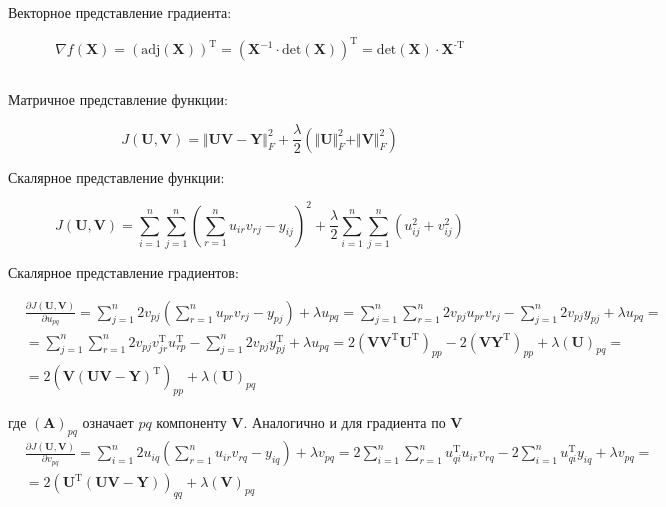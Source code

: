 	Векторное представление градиента:
	
	\begin{equation}
	\nabla f(\mathbf{X})  = (\text{adj}(\mathbf{X}))^{\text{T}} =
	(\mathbf{X}^{-1}\cdot \text{det}(\mathbf{X}))^{\text{T}} =
	\text{det}(\mathbf{X}) \cdot\mathbf{X}^{\text{-T}}
	\end{equation}
	
	\subsection{}
	
	Матричное представление функции:
	
	\begin{equation}
	J(\mathbf{U}, \mathbf{V}) = \Vert \mathbf{U} \mathbf{V} - \mathbf{Y} \Vert_F^2
	+ \frac{\lambda}{2}(\Vert \mathbf{U} \Vert_F^2 + \Vert \mathbf{V}\Vert_F^2)
	\end{equation}
	
	Скалярное представление функции:
	
	\begin{equation}
	J(\mathbf{U}, \mathbf{V}) = \sum\limits_{i=1}^{n} \sum\limits_{j=1}^{n}
	(\sum\limits_{r=1}^{n}u_{ir}v_{rj}-y_{ij})^2 +
	\frac{\lambda}{2}\sum\limits_{i=1}^{n} \sum\limits_{j=1}^{n}(u_{ij}^2+v_{ij}^2)
	\end{equation}
	
	Скалярное представление градиентов:
	
	\begin{equation}
	\begin{split}
	&\frac{\partial J(\mathbf{U}, \mathbf{V})}{\partial u_{pq}} =
	\sum\limits_{j=1}^{n}2v_{pj} (\sum\limits_{r=1}^{n}u_{pr}v_{rj}-y_{pj}) +
	\lambda u_{pq} =\sum\limits_{j=1}^{n} \sum\limits_{r=1}^{n} 2v_{pj}
	u_{pr}v_{rj}-\sum\limits_{j=1}^{n} 2v_{pj} y_{pj} + \lambda u_{pq}= \\
	&=\sum\limits_{j=1}^{n} \sum\limits_{r=1}^{n} 2v_{pj}v_{jr}^\text{T}
	u_{rp}^\text{T}-\sum\limits_{j=1}^{n} 2v_{pj} y_{pj}^\text{T} + \lambda u_{pq} =
	2(\mathbf{V}\mathbf{V}^\text{T}\mathbf{U}^\text{T})_{pp} -
	2(\mathbf{V}\mathbf{Y}^\text{T})_{pp} + \lambda (\mathbf{U})_{pq}= \\
	&= 2 (\mathbf{V} (\mathbf{U}\mathbf{V} - \mathbf{Y})^\text{T})_{pp} + \lambda
	(\mathbf{U})_{pq} 
	\end{split}
	\end{equation}
	
	где $(\mathbf{A})_{pq}$ означает $pq$ компоненту $\mathbf{V}$. Аналогично и для
	градиента по $\mathbf{V}$
	\begin{equation}
	\begin{split}
	&\frac{\partial J(\mathbf{U}, \mathbf{V})}{\partial v_{pq}} =
	\sum\limits_{i=1}^{n}2u_{iq} (\sum\limits_{r=1}^{n}u_{ir}v_{rq}-y_{iq}) +
	\lambda v_{pq} = 2\sum\limits_{i=1}^{n} \sum\limits_{r=1}^{n} u_{qi}^\text{T}
	u_{ir}v_{rq}- 2\sum\limits_{i=1}^{n} u_{qi}^\text{T} y_{iq} + \lambda v_{pq} =
	\\
	&= 2 (\mathbf{U}^\text{T} (\mathbf{U}\mathbf{V} - \mathbf{Y}))_{qq} + \lambda
	(\mathbf{V})_{pq}  
	\end{split}
	\end{equation}
	
